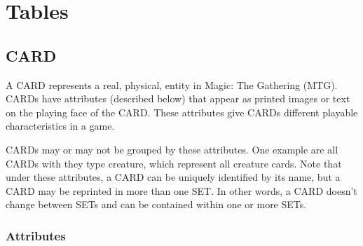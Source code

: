 \documentclass{article}
\newcommand{\tablesection}[2] {
    \subsection{#1}  %
    #2  %
    \subsubsection{Attributes}
}
\begin{document}

\section{Tables}
\tablesection{CARD}{
    
        A CARD represents a real, physical, entity in Magic: The Gathering (MTG). CARDs have attributes (described below) that appear as printed images or text on the playing face of the CARD. These attributes give CARDs different playable characteristics in a game.

    CARDs may or may not be grouped by these attributes. One example are all CARDs with they type creature, which represent all creature cards.  Note that under these attributes, a CARD can be uniquely identified by its name, but a CARD may be reprinted in more than one SET.  In other words, a CARD doesn't change between SETs and can be contained within one or more SETs.
}
\end{document}

